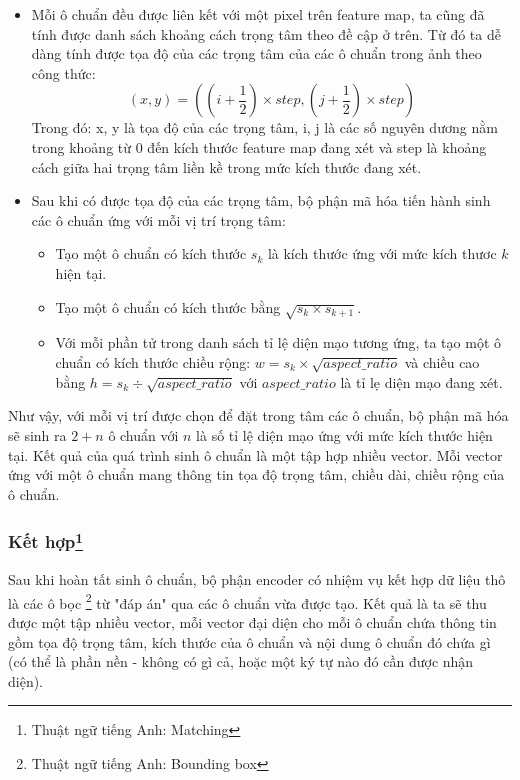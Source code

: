 \documentclass[a4paper,12pt]{article}
\begin{document}
	\begin{itemize}
		
		\item Mỗi ô chuẩn đều được liên kết với một pixel trên feature map, ta cũng đã tính được danh sách khoảng cách trọng tâm theo đề cập ở trên. Từ đó ta dễ dàng tính được tọa độ của các trọng tâm của các ô chuẩn trong ảnh theo công thức:
		$$ (x, y) =\left( \left(i + \frac{1}{2} \right) \times step, \left(j + \frac{1}{2} \right) \times step \right)$$
		Trong đó: x, y là tọa độ của các trọng tâm, i, j là các số nguyên dương nằm trong khoảng từ 0 đến kích thước feature map đang xét và step là khoảng cách giữa hai trọng tâm liền kề trong mức kích thước đang xét.
		
		\item Sau khi có được tọa độ của các trọng tâm, bộ phận mã hóa tiến hành sinh các ô chuẩn ứng với mỗi vị trí trọng tâm: 
		
		\begin{itemize}
			\item Tạo một ô chuẩn có kích thước $s_k$ là kích thước ứng với mức kích thươc $k$ hiện tại.
			\item Tạo một ô chuẩn có kích thước bằng $\sqrt{s_k \times s_{k + 1}}$.
			\item Với mỗi phần tử trong danh sách tỉ lệ diện mạo tương ứng, ta tạo một ô chuẩn có kích thước chiều rộng: $w = s_k \times \sqrt{aspect\_ratio}$ và chiều cao bằng $h = s_k \div \sqrt{aspect\_ratio}$ với $aspect\_ratio$ là tỉ lẹ diện mạo đang xét.
		\end{itemize}
		
	\end{itemize}
	
	Như vậy, với mỗi vị trí được chọn để đặt trong tâm các ô chuẩn, bộ phận mã hóa sẽ sinh ra $2 + n$ ô chuẩn với $n$ là số tỉ lệ diện mạo ứng với mức kích thước hiện tại. Kết quả của quá trình sinh ô chuẩn là một tập hợp nhiều vector. Mỗi vector ứng với một ô chuẩn mang thông tin tọa độ trọng tâm, chiều dài, chiều rộng của ô chuẩn.
	
	\subsubsection*{Kết hợp\footnote{Thuật ngữ tiếng Anh: Matching}}
	
	Sau khi hoàn tất sinh ô chuẩn, bộ phận encoder có nhiệm vụ kết hợp dữ liệu thô là các ô bọc \footnote{Thuật ngữ tiếng Anh: Bounding box} từ "đáp án" qua các ô chuẩn vừa được tạo. Kết quả là ta sẽ thu được một tập nhiều vector, mỗi vector đại diện cho mỗi ô chuẩn chứa thông tin gồm tọa độ trọng tâm, kích thước của ô chuẩn và nội dung ô chuẩn đó chứa gì (có thể là phần nền - không có gì cả, hoặc một ký tự nào đó cần được nhận diện). \\
	
\end{document}
